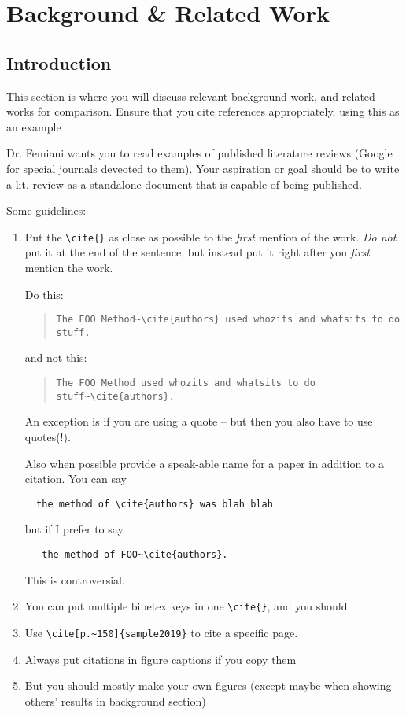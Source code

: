 \chapter{Background \& Related Work}
\label{chap:background}

\section{Introduction}
\label{sec:background:introducton}
This section is where you will discuss relevant background work, and related works for comparison. Ensure that you cite references appropriately, using this as an example~\cite{sample2019}

Dr. Femiani wants you to read examples of published literature reviews (Google for special journals deveoted to them).  Your aspiration or goal should be to write a lit. review as a standalone document that is capable of being published.

 Some guidelines:

\begin{enumerate}
    \item  Put the \verb|\cite{}| as close as possible to the \emph{first} mention of the work.
     \emph{Do not} put it at the end of the sentence, but instead put it right after you \emph{first} mention the work.

     Do this:
\begin{quote}
         \verb|The FOO Method~\cite{authors} used whozits and whatsits to do stuff.|
\end{quote}
     and not this:
    \begin{quote}
         \verb|The FOO Method used whozits and whatsits to do stuff~\cite{authors}.|
    \end{quote}
   An exception is if you are using a quote -- but then you also have to
   use quotes(!).

   Also when possible provide a speak-able name for a paper in addition to
   a citation. You can say
   \begin{verbatim}
  the method of \cite{authors} was blah blah
   \end{verbatim}
   but if I prefer to say
\begin{verbatim}
   the method of FOO~\cite{authors}.
\end{verbatim}
   This is controversial.

\item  You can put multiple bibetex keys in one \verb|\cite{}|, and you should
\item Use \verb|\cite[p.~150]{sample2019}| to cite a specific page.
\item Always put citations in figure captions if you copy them
\item But you should mostly make your own figures (except maybe when showing others' results in background section)
\end{enumerate}

